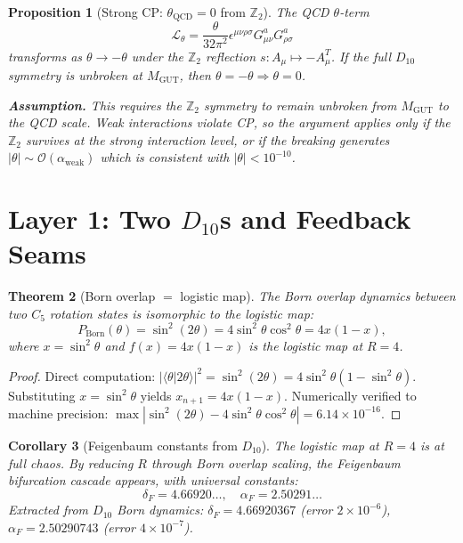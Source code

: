 \documentclass[11pt,a4paper]{article}
\newtheorem{theorem}{Theorem}
\newtheorem{proposition}[theorem]{Proposition}
\newtheorem{corollary}[theorem]{Corollary}
\begin{document}
\begin{proposition}[Strong CP: $\theta_{\text{QCD}} = 0$ from $\mathbb{Z}_2$]
\label{prop:cp}
The QCD $\theta$-term
\[
\mathcal{L}_\theta = \frac{\theta}{32\pi^2} \epsilon^{\mu\nu\rho\sigma} G^a_{\mu\nu} G^a_{\rho\sigma}
\]
transforms as $\theta \to -\theta$ under the $\mathbb{Z}_2$ reflection $s: A_\mu \mapsto -A_\mu^T$. If the full $D_{10}$ symmetry is unbroken at $M_{\text{GUT}}$, then $\theta = -\theta \Rightarrow \theta = 0$.

\textbf{Assumption.} This requires the $\mathbb{Z}_2$ symmetry to remain unbroken from $M_{\text{GUT}}$ to the QCD scale. Weak interactions violate CP, so the argument applies only if the $\mathbb{Z}_2$ survives at the strong interaction level, or if the breaking generates $|\theta| \sim \mathcal{O}(\alpha_{\text{weak}})$ which is consistent with $|\theta| < 10^{-10}$.
\end{proposition}

\section{Layer 1: Two $D_{10}$s and Feedback Seams}
\label{sec:layer1}

\begin{theorem}[Born overlap $=$ logistic map]
\label{thm:born}
The Born overlap dynamics between two $C_5$ rotation states is isomorphic to the logistic map:
\[
P_{\text{Born}}(\theta) = \sin^2(2\theta) = 4\sin^2\theta\cos^2\theta = 4x(1-x),
\]
where $x = \sin^2\theta$ and $f(x) = 4x(1-x)$ is the logistic map at $R = 4$.
\end{theorem}

\begin{proof}
Direct computation: $|\langle\theta|2\theta\rangle|^2 = \sin^2(2\theta) = 4\sin^2\theta(1 - \sin^2\theta)$. Substituting $x = \sin^2\theta$ yields $x_{n+1} = 4x(1-x)$. Numerically verified to machine precision: $\max|\sin^2(2\theta) - 4\sin^2\theta\cos^2\theta| = 6.14 \times 10^{-16}$.
\end{proof}

\begin{corollary}[Feigenbaum constants from $D_{10}$]
The logistic map at $R = 4$ is at full chaos. By reducing $R$ through Born overlap scaling, the Feigenbaum bifurcation cascade appears, with universal constants:
\[
\delta_F = 4.66920\ldots, \quad \alpha_F = 2.50291\ldots
\]
Extracted from $D_{10}$ Born dynamics: $\delta_F = 4.66920367$ (error $2 \times 10^{-6}$), $\alpha_F = 2.50290743$ (error $4 \times 10^{-7}$).
\end{corollary}
\end{document}
